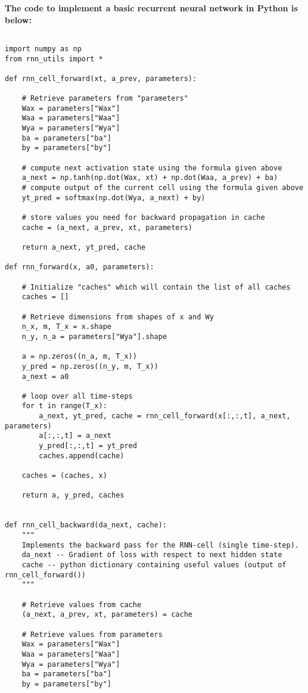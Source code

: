 \documentclass{article}
\begin{document}
\noindent
\textbf{The code to implement a basic recurrent neural network in Python is below:}

\begin{lstlisting}

import numpy as np
from rnn_utils import *

def rnn_cell_forward(xt, a_prev, parameters):

    # Retrieve parameters from "parameters"
    Wax = parameters["Wax"]
    Waa = parameters["Waa"]
    Wya = parameters["Wya"]
    ba = parameters["ba"]
    by = parameters["by"]

    # compute next activation state using the formula given above
    a_next = np.tanh(np.dot(Wax, xt) + np.dot(Waa, a_prev) + ba)
    # compute output of the current cell using the formula given above
    yt_pred = softmax(np.dot(Wya, a_next) + by)

    # store values you need for backward propagation in cache
    cache = (a_next, a_prev, xt, parameters)

    return a_next, yt_pred, cache

def rnn_forward(x, a0, parameters):

    # Initialize "caches" which will contain the list of all caches
    caches = []

    # Retrieve dimensions from shapes of x and Wy
    n_x, m, T_x = x.shape
    n_y, n_a = parameters["Wya"].shape

    a = np.zeros((n_a, m, T_x))
    y_pred = np.zeros((n_y, m, T_x))
    a_next = a0

    # loop over all time-steps
    for t in range(T_x):
        a_next, yt_pred, cache = rnn_cell_forward(x[:,:,t], a_next, parameters)
        a[:,:,t] = a_next
        y_pred[:,:,t] = yt_pred
        caches.append(cache)

    caches = (caches, x)

    return a, y_pred, caches


def rnn_cell_backward(da_next, cache):
    """
    Implements the backward pass for the RNN-cell (single time-step).
    da_next -- Gradient of loss with respect to next hidden state
    cache -- python dictionary containing useful values (output of rnn_cell_forward())
    """

    # Retrieve values from cache
    (a_next, a_prev, xt, parameters) = cache

    # Retrieve values from parameters
    Wax = parameters["Wax"]
    Waa = parameters["Waa"]
    Wya = parameters["Wya"]
    ba = parameters["ba"]
    by = parameters["by"]


\end{lstlisting}
\end{document}
